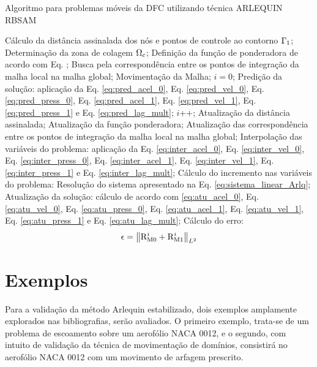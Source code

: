 \documentclass[tese_patricia]{subfiles}
\begin{document}
\begin{algorithm}
	\caption{Algoritmo para problemas móveis da DFC utilizando técnica ARLEQUIN RBSAM}
	\label{alg:fluid_temporalIntegrationARLQ}
	\begin{algorithmic}[1]
		\State Cálculo da distância assinalada dos nós e pontos de controle ao contorno $\Gamma_1$;
		\State Determinação da zona de colagem $\Omega_c$;
		\State Definição da função de ponderadora de acordo com Eq. ;
		\State Busca pela correspondência entre os pontos de integração da malha local na malha global;
		\State Movimentação da Malha;
		\State $i=0$;
		\State Predição da solução: aplicação da Eq. \eqref{eq:pred_acel_0}, Eq. \eqref{eq:pred_vel_0}, Eq. \eqref{eq:pred_press_0},
		Eq. \eqref{eq:pred_acel_1}, Eq. \eqref{eq:pred_vel_1}, Eq. \eqref{eq:pred_press_1} e Eq. \eqref{eq:pred_lag_mult};
		\State $i$++;
		\State Atualização da distância assinalada;
		\State Atualização da função ponderadora;
		\State Atualização das correspondência entre os pontos de integração da malha local na malha global;
		\State Interpolação das variáveis do problema: aplicação da Eq. \eqref{eq:inter_acel_0}, Eq. \eqref{eq:inter_vel_0}, Eq. \eqref{eq:inter_press_0},
		Eq. \eqref{eq:inter_acel_1}, Eq. \eqref{eq:inter_vel_1}, Eq. \eqref{eq:inter_press_1} e Eq. \eqref{eq:inter_lag_mult}; 
		\State Cálculo do incremento nas variáveis do problema: Resolução do sistema apresentado na Eq. \eqref{eq:sistema_linear_Arlq};
		\State Atualização da solução: cálculo de acordo com \eqref{eq:atu_acel_0}, Eq. \eqref{eq:atu_vel_0}, Eq. \eqref{eq:atu_press_0},
		Eq. \eqref{eq:atu_acel_1}, Eq. \eqref{eq:atu_vel_1}, Eq. \eqref{eq:atu_press_1} e Eq. \eqref{eq:atu_lag_mult};
		\State Cálculo do erro:
		\begin{align}
			\epsilon =\left\| \mathrm{R}_\mathrm{M0}^{i} + \mathrm{R}_\mathrm{M1}^{i}  \right\|_{L^2}
		\end{align}
		\EndWhile
		\EndFor
	\end{algorithmic}
\end{algorithm}


\section{Exemplos}\label{capitulo:Cap6:Exemplos}

Para a validação da método Arlequin estabilizado, dois exemplos amplamente explorados nas bibliografias, serão avaliados. O primeiro exemplo, trata-se de um problema de escoamento sobre um aerofólio NACA 0012, e o segundo, com intuito de validação da técnica de movimentação de domínios, consistirá no aerofólio NACA 0012 com um movimento de arfagem prescrito. 
\end{document}
